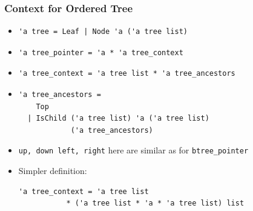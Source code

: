 \begin{frame}[fragile]
\frametitle{Context for Ordered Tree}

\begin{itemize}[<+->]
\item
\begin{lstlisting}
'a tree = Leaf | Node 'a ('a tree list)
\end{lstlisting}

\item
\begin{lstlisting}
'a tree_pointer = 'a * 'a tree_context
\end{lstlisting}

\item 
\begin{lstlisting}
'a tree_context = 'a tree list * 'a tree_ancestors
\end{lstlisting}

\item 
\begin{lstlisting}
'a tree_ancestors =
    Top
  | IsChild ('a tree list) 'a ('a tree list)
            ('a tree_ancestors)
\end{lstlisting}

\item \lstinline|up, down left, right| here are similar as for \lstinline|btree_pointer|

\item 
Simpler definition:\\
\begin{lstlisting}
'a tree_context = 'a tree list
           * ('a tree list * 'a * 'a tree list) list
\end{lstlisting}
\end{itemize}

\end{frame}


